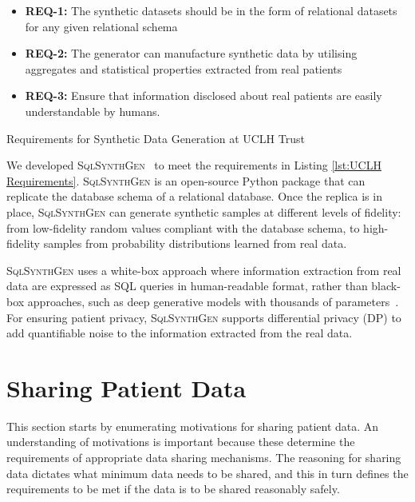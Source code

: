 \documentclass[11pt]{article}
\begin{document}
\begin{listing}[ht]
\begin{itemize}
    \item \textbf{REQ-1:} The synthetic datasets should be in the form of relational datasets for any given relational schema
    \item \textbf{REQ-2:} The generator can manufacture synthetic data by utilising aggregates and statistical properties extracted from real patients
    \item \textbf{REQ-3:} Ensure that information disclosed about real patients are easily understandable by humans. 
\end{itemize}
\caption{Requirements for Synthetic Data Generation at UCLH Trust}
\label{lst:UCLH Requirements}
\end{listing}

We developed \textsc{SqlSynthGen}~\cite{repository} to meet the requirements in Listing \ref{lst:UCLH Requirements}. \textsc{SqlSynthGen} is an open-source Python package that can replicate the database schema of a relational database. Once the replica is in place, \textsc{SqlSynthGen} can generate synthetic samples at different levels of fidelity: from low-fidelity random values compliant with the database schema, to high-fidelity samples from probability distributions learned from real data. 

\textsc{SqlSynthGen} uses a white-box approach where information extraction from real data are expressed as SQL queries in human-readable format, rather than black-box approaches, such as deep generative models with thousands of parameters~\cite{DBLP:journals/pami/Bond-TaylorLLW22}. For ensuring patient privacy, \textsc{SqlSynthGen} supports differential privacy (DP)\cite{DworkR14} to add quantifiable noise to the information extracted from the real data.

\section{Sharing Patient Data}

This section starts by enumerating motivations for sharing patient data. An understanding of motivations is important because these determine the requirements of appropriate data sharing mechanisms. The reasoning for sharing data dictates what minimum data needs to be shared, and this in turn defines the requirements to be met if the data is to be shared reasonably safely.
\end{document}
